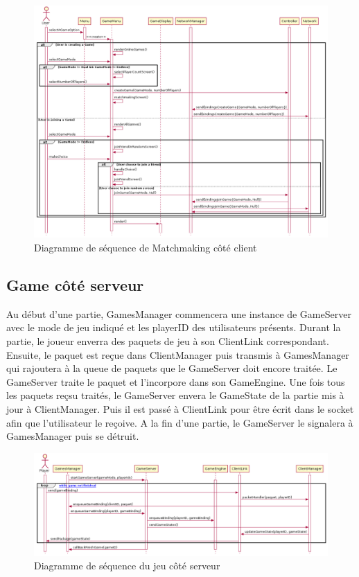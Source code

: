 \documentclass{article}
\begin{document}
\begin{figure}[H]
    \centering
    \includegraphics[width=1\textwidth]{../res/uml/sequence/MatchMakingClientSequence.png}
    \caption{Diagramme de séquence de Matchmaking côté client}
    \label{fig:MatchmakingClientDiagram}
\end{figure}

\subsection{Game côté serveur}

Au début d'une partie, GamesManager commencera une instance de GameServer avec le mode de jeu indiqué et les playerID des utilisateurs présents. Durant la partie, le joueur enverra des paquets de jeu à son ClientLink correspondant. Ensuite, le paquet est reçue dans ClientManager puis transmis à GamesManager qui rajoutera à la queue de paquets que le GameServer doit encore traitée. Le GameServer traite le paquet et l'incorpore dans son GameEngine. Une fois tous les paquets reçsu traités, le GameServer envera le GameState de la partie mis à jour à ClientManager. Puis il est passé à ClientLink pour être écrit dans le socket afin que l'utilisateur le reçoive. A la fin d'une partie, le GameServer le signalera à GamesManager puis se détruit.

\begin{figure}[H]
    \centering
    \includegraphics[width=1\textwidth]{../res/uml/sequence/GameServerSequence.png}
    \caption{Diagramme de séquence du jeu côté serveur}
    \label{fig:GameServerSeqDiagram}
\end{figure}
\end{document}
